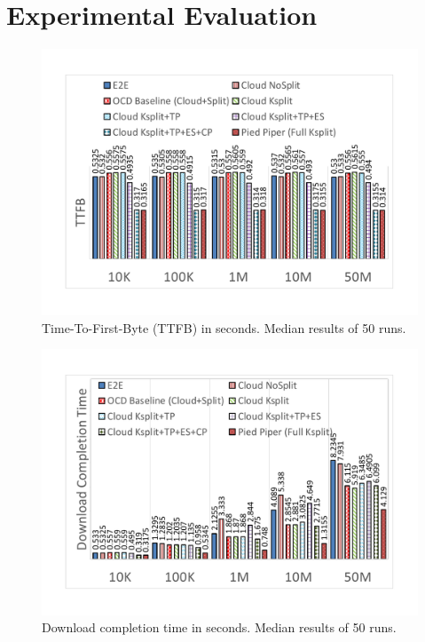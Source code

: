 \section{Experimental Evaluation}\label{sec:eval}
\begin{figure}
  \centering
    \includegraphics[width=\columnwidth,trim=20mm 25mm 20mm 22mm,clip]{figures/oursys-ttfb.pdf}
    \caption{Time-To-First-Byte (TTFB) in seconds. Median results of 50 runs.}%
    \label{fig:oursys-ttfb}
\end{figure}

\begin{figure}
  \centering
    \includegraphics[width=\columnwidth,trim=20mm 25mm 20mm 23mm,clip]{figures/oursys-download.pdf}
    \caption{Download completion time in seconds. Median results of 50 runs.} 
    \label{fig:oursys-download}
\end{figure}

